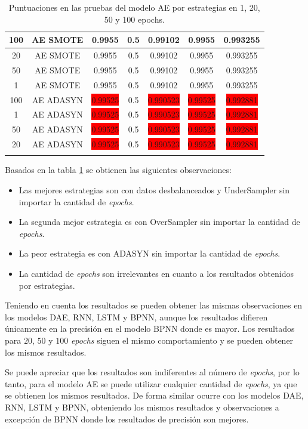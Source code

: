 \begin{longtable}{|c|c|c|c|c|c|c|}
	100 & AE SMOTE & 0.9955 & 0.5 & 0.99102 & 0.9955 & 0.993255\\ \hline
	20 & AE SMOTE & 0.9955 & 0.5 & 0.99102 & 0.9955 & 0.993255\\ \hline
	50 & AE SMOTE & 0.9955 & 0.5 & 0.99102 & 0.9955 & 0.993255\\ \hline
	1 & AE SMOTE & 0.9955 & 0.5 & 0.99102 & 0.9955 & 0.993255\\ \hline
	100 & AE ADASYN & \colorbox{red}{0.99525} & 0.5 & \colorbox{red}{0.990523} & \colorbox{red}{0.99525} & \colorbox{red}{0.992881}\\ \hline
	1 & AE ADASYN & \colorbox{red}{0.99525} & 0.5 & \colorbox{red}{0.990523} & \colorbox{red}{0.99525} & \colorbox{red}{0.992881}\\ \hline
	50 & AE ADASYN & \colorbox{red}{0.99525} & 0.5 & \colorbox{red}{0.990523} & \colorbox{red}{0.99525} & \colorbox{red}{0.992881}\\ \hline
	20 & AE ADASYN & \colorbox{red}{0.99525} & 0.5 & \colorbox{red}{0.990523} & \colorbox{red}{0.99525} & \colorbox{red}{0.992881}\\ \hline
	\caption{Puntuaciones en las pruebas del modelo AE por estrategias en 1, 20, 50 y 100 epochs.}
	\label{t:10}
\end{longtable}

Basados en la tabla \ref{t:10} se obtienen las siguientes observaciones:
\begin{itemize}
	\item Las mejores estrategias son con datos desbalanceados y UnderSampler sin importar la cantidad de \textit{epochs}.
	\item La segunda mejor estrategia es con OverSampler sin importar la cantidad de \textit{epochs}.
	\item La peor estrategia es con ADASYN sin importar la cantidad de \textit{epochs}.
	\item La cantidad de \textit{epochs} son irrelevantes en cuanto a los resultados obtenidos por estrategias.
\end{itemize}

Teniendo en cuenta los resultados se pueden obtener las mismas observaciones en los modelos DAE, RNN, LSTM y BPNN, aunque los resultados difieren \'{u}nicamente en la precisi\'{o}n en el modelo BPNN donde es mayor. Los resultados para $20$, $50$ y $100$ \textit{epochs} siguen el mismo comportamiento y se pueden obtener los mismos resultados.

Se puede apreciar que los resultados son indiferentes al n\'{u}mero de \textit{epochs}, por lo tanto, para el modelo AE se puede utilizar cualquier cantidad de \textit{epochs}, ya que se obtienen los mismos resultados. De forma similar ocurre con los modelos DAE, RNN, LSTM y BPNN, obteniendo los mismos resultados y observaciones a excepci\'{o}n de BPNN donde los resultados de precisi\'{o}n son mejores.

